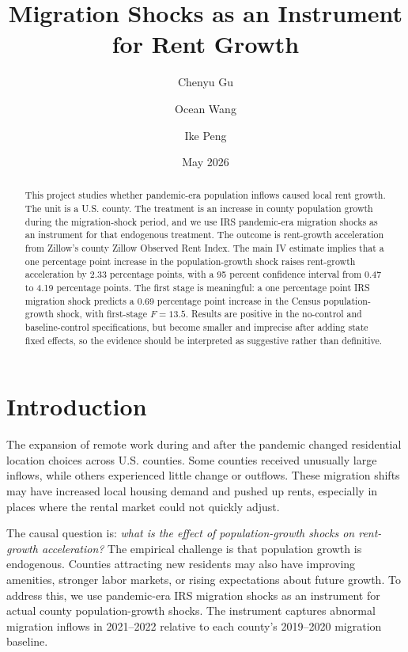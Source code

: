 \documentclass[11pt]{article}
\title{Migration Shocks as an Instrument for Rent Growth}
\author{Chenyu Gu \and Ocean Wang \and Ike Peng}
\date{May 2026}
\begin{document}
\maketitle

\begin{abstract}
This project studies whether pandemic-era population inflows caused local rent growth. The unit is a U.S. county. The treatment is an increase in county population growth during the migration-shock period, and we use IRS pandemic-era migration shocks as an instrument for that endogenous treatment. The outcome is rent-growth acceleration from Zillow's county Zillow Observed Rent Index. The main IV estimate implies that a one percentage point increase in the population-growth shock raises rent-growth acceleration by 2.33 percentage points, with a 95 percent confidence interval from 0.47 to 4.19 percentage points. The first stage is meaningful: a one percentage point IRS migration shock predicts a 0.69 percentage point increase in the Census population-growth shock, with first-stage $F=13.5$. Results are positive in the no-control and baseline-control specifications, but become smaller and imprecise after adding state fixed effects, so the evidence should be interpreted as suggestive rather than definitive.
\end{abstract}

\section{Introduction}

The expansion of remote work during and after the pandemic changed residential location choices across U.S. counties. Some counties received unusually large inflows, while others experienced little change or outflows. These migration shifts may have increased local housing demand and pushed up rents, especially in places where the rental market could not quickly adjust.

The causal question is: \emph{what is the effect of population-growth shocks on rent-growth acceleration?} The empirical challenge is that population growth is endogenous. Counties attracting new residents may also have improving amenities, stronger labor markets, or rising expectations about future growth. To address this, we use pandemic-era IRS migration shocks as an instrument for actual county population-growth shocks. The instrument captures abnormal migration inflows in 2021--2022 relative to each county's 2019--2020 migration baseline.
\end{document}
